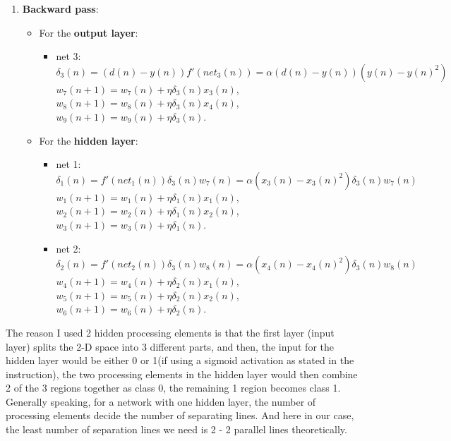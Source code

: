 \documentclass[a4paper]{article}
\begin{document}
\begin{spacing}{2.0}
\begin{itemize}
\begin{enumerate}
\item \textbf{Backward pass}:
  \begin{itemize}
  \item For the \textbf{output layer}:
	\begin{itemize}
	\item net 3: \\
	$\delta_3(n) = (d(n)-y(n))f'(net_3(n)) = \alpha(d(n)-y(n))(y(n)-y(n)^2)$\\
	$w_7(n+1) = w_7(n) + \eta \delta_3(n)x_3(n)$, $w_8(n+1) = w_8(n) + \eta \delta_3(n)x_4(n)$, $w_9(n+1) = w_9(n) + \eta 		\delta_3(n)$.
	\end{itemize}
  \item For the \textbf{hidden layer}:
  \begin{itemize}
	\item net 1: \\
	$\delta_1(n) = f'(net_1(n))\delta_3(n)w_7(n) = \alpha(x_3(n)-x_3(n)^2)\delta_3(n)w_7(n)$\\
	$w_1(n+1) = w_1(n) + \eta \delta_1(n)x_1(n)$, $w_2(n+1) = w_2(n) + \eta \delta_1(n)x_2(n)$, $w_3(n+1) = w_3(n) + \eta 		\delta_1(n)$.
	
	\item net 2:\\
	$\delta_2(n) = f'(net_2(n))\delta_3(n)w_8(n) = \alpha(x_4(n)-x_4(n)^2)\delta_3(n)w_8(n)$\\
	$w_4(n+1) = w_4(n) + \eta \delta_2(n)x_1(n)$, $w_5(n+1) = w_5(n) + \eta \delta_2(n)x_2(n)$, $w_6(n+1) = w_6(n) + \eta 		\delta_2(n)$.
	
  \end{itemize}
\end{itemize}
\end{enumerate}
The reason I used 2 hidden processing elements is that the first layer (input layer) splits the 2-D space into 3 different parts, and then, the input for the hidden layer would be either 0 or 1(if using a sigmoid activation as stated in the instruction), the two processing elements in the hidden layer would then combine 2 of the 3 regions together as class 0, the remaining 1 region becomes class 1. Generally speaking, for a network with one hidden layer, the number of processing elements decide the number of separating lines. And here in our case, the least number of separation lines we need is 2 - 2 parallel lines theoretically.


\end{itemize}
\end{spacing}
\end{document}
